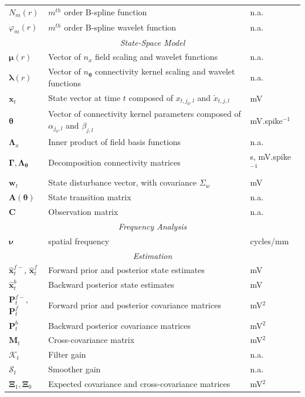 \documentclass[review,authoryear,3p]{elsarticle}
\begin{document}
\begin{table}[!t]
\begin{tabular}{|l|l|l|}
	$N_m(r)$&$m^{th}$ order B-spline function&n.a.\\
	$\varphi_m(r)$&$m^{th}$ order B-spline wavelet function&n.a.\\
	\hline
	\multicolumn{3}{|c|}{\emph{State-Space Model}} \\
	\hline
		$\boldsymbol\mu(r)$&Vector of $n_x$ field scaling and wavelet functions&n.a.\\
		$\boldsymbol\lambda(r)$&Vector of $n_{\boldsymbol\theta}$ connectivity kernel scaling and wavelet functions&n.a.\\
   	$\mathbf{x}_t$ & State vector at time $t$ composed of  $x_{t,j_{0},l}$ and $\check{x}_{t,j,l}$ & mV\\ 
		$\boldsymbol\theta$&Vector of connectivity kernel parameters composed of $\alpha_{j_0,l}$ and $\beta_{j,l}$& mV.spike$^{-1}$\\ 
		$\boldsymbol{\Lambda}_x$&Inner product of field basis functions&n.a.\\
		$\boldsymbol\Gamma, \boldsymbol\Lambda_{\boldsymbol{\theta}}$&Decomposition connectivity matrices&s, mV.spike$^{-1}$\\
   	$\mathbf{w}_t$ & State disturbance vector, with covariance $\Sigma_w$ & mV\\ 
    $\mathbf{A}(\boldsymbol{\theta})$& State transition matrix& n.a.\\
   	$\mathbf{C}$ & Observation matrix & n.a. \\
	\hline
	\multicolumn{3}{|c|}{\emph{Frequency Analysis}} \\
	\hline
	$\boldsymbol{\nu}$& spatial frequency  & cycles/mm \\
	\hline
	\multicolumn{3}{|c|}{\emph{Estimation}} \\
	\hline
	$\hat{\mathbf{x}}_t^{f-}$, $\hat{\mathbf{x}}_t^f$ & Forward prior and posterior state estimates & mV\\
	$\hat{\mathbf{x}}_t^{b}$ & Backward posterior state estimates & mV\\
	$\mathbf P^{f-}_t$, $\mathbf P^f_t$  & Forward prior and posterior covariance matrices & mV$^2$\\
	$\mathbf P^b_t$ & Backward posterior covariance matrices & mV$^2$\\
	$\mathbf M_t$& Cross-covariance matrix & mV$^2$\\
	$\mathcal K_{t} $ & Filter gain & n.a.\\ 
	$\mathcal S_{t} $ & Smoother gain & n.a.\\ 
	$\boldsymbol\Xi_1, \boldsymbol\Xi_0$&Expected covariance and cross-covariance matrices& mV$^2$\\ 

\end{tabular}
\end{table}
\end{document}
